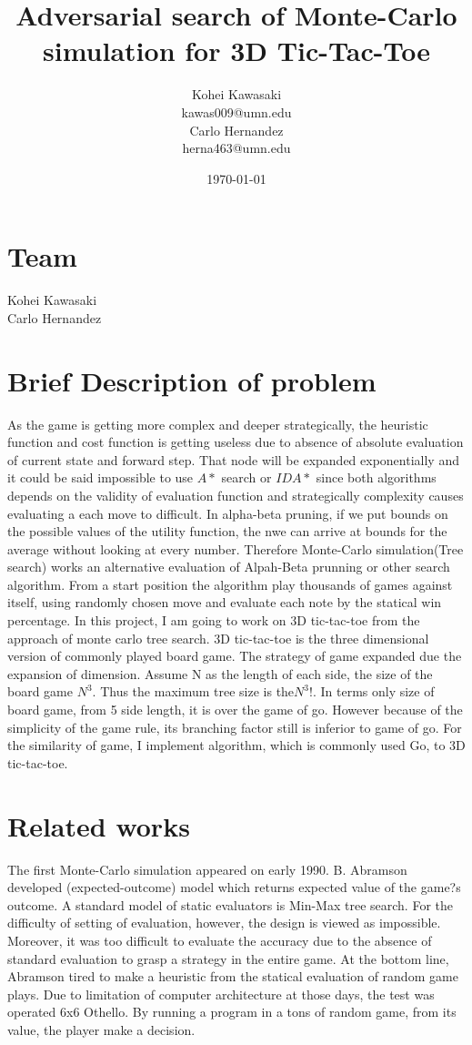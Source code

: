 \documentclass[11pt]{article}
\title{Adversarial search of Monte-Carlo simulation for 3D Tic-Tac-Toe}
\author{
Kohei Kawasaki\\kawas009@umn.edu\\
Carlo Hernandez\\herna463@umn.edu
}
\date{\today}
\begin{document}
\maketitle

\section{Team}
Kohei Kawasaki\\
Carlo Hernandez
\label{sec:rw}
\section{Brief Description of problem}
As the game is getting more complex and deeper strategically, the heuristic function and cost function is getting useless due to absence of absolute evaluation of current state and forward step. That node will be expanded exponentially and it could be said impossible to use \(A*\) search or \(IDA*\) since both algorithms depends on the validity of evaluation function and strategically complexity causes evaluating a each move to difficult. In alpha-beta pruning, if we put bounds on the possible values of the utility function, the nwe can arrive at bounds for the average without looking at every number.
Therefore Monte-Carlo simulation(Tree search) works an alternative evaluation of Alpah-Beta prunning or other search algorithm. From a start position the algorithm play thousands of games against itself, using randomly chosen move and evaluate each note by the statical win percentage. In this project, I am going to work on 3D tic-tac-toe from the approach of monte carlo tree search. 3D tic-tac-toe is the three dimensional version of commonly played board game. The strategy of game expanded due the expansion of dimension. Assume N as the length of each side, the size of the board game \(N^3\). Thus the maximum tree size is the\(N^3!\). In terms only size of board game, from 5 side length, it is over the game of go. However because of the simplicity of the game rule, its branching factor still is inferior to game of go. For the similarity of game, I implement algorithm, which is commonly used Go, to 3D tic-tac-toe.

\section{Related works}
The first Monte-Carlo simulation appeared on early 1990. B. Abramson developed (expected-outcome) model which returns expected value of the game?s outcome\cite{abramson1990expected}. A standard model of static evaluators is Min-Max tree search. For the difficulty of setting of evaluation, however, the design is viewed as impossible. Moreover, it was too difficult to evaluate the accuracy due to the absence of standard evaluation to grasp a strategy in the entire game.  At the bottom line, Abramson tired to make a heuristic from the statical evaluation of random game plays. Due to limitation of computer architecture at those days, the test was operated 6x6 Othello. By running a program in a tons of random game, from its value, the player make a decision. 
\end{document}
